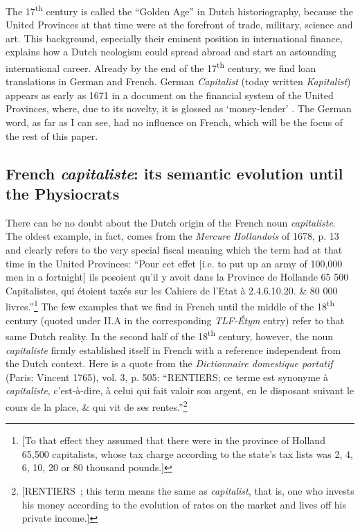 \documentclass[output=paper]{langsci/langscibook}
\begin{document}
\largerpage[-2]
The 17\textsuperscript{th} century is called the ``Golden Age'' in Dutch
historiography, because the United Provinces at that time were at the
forefront of trade, military, science and art. This background,
especially their eminent position in international finance, explains how
a Dutch neologism could spread abroad and start an a\-stounding
international career. Already by the end of the 17\textsuperscript{th}
century, we find loan translations in German and French. German
\emph{Capitalist} (today written \emph{Kapitalist}) appears as early as
1671 in a document on the financial system of the United Provinces,
where, due to its novelty, it is glossed as `money-lender' %
\citep[10]{Rainer98}%
%
. The German word, as far as I can see, had no influence on French,
which will be the focus of the rest of this paper.

\subsection{French \emph{capitaliste}: its semantic evolution until the
Physiocrats}

\largerpage[-2]

There can be no doubt about the Dutch origin of the French noun
\emph{capitaliste}. The oldest example, in fact, comes from the
\emph{Mercure Hollandois} of 1678, p. 13 and clearly refers to the very
special fiscal meaning which the term had at that time in the United
Provinces: ``Pour cet effet {[}i.e. to put up an army of 100,000 men in a
fortnight{]} ils posoient qu'il y avoit dans la Province de Hollande 65
500 Capitalistes, qui étoient taxés sur les Cahiers de l'Etat à
2.4.6.10.20. \& 80 000 livres.''\footnote{{[}To that effect they assumed
  that there were in the province of Holland 65,500 capitalists, whose
  tax charge according to the state's tax lists was 2, 4, 6, 10, 20 or
  80 thousand pounds.{]}} The few examples that we find in French until
the middle of the 18\textsuperscript{th} century (quoted under II.A in
the corresponding \emph{TLF-Étym} entry) refer to that same Dutch
reality. In the second half of the 18\textsuperscript{th} century,
however, the noun \emph{capitaliste} firmly established itself in French
with a reference independent from the Dutch context. Here is a quote
from the \emph{Dictionnaire domestique portatif} (Paris: Vincent 1765),
vol. 3, p. 505: ``RENTIERS; ce terme est synonyme à \emph{capitaliste},
c'est-à-dire, à celui qui fait valoir son argent, en le disposant
suivant le cours de la place, \& qui vit de ses rentes.''\footnote{{[}RENTIERS~;
  this term means the same as \emph{capitalist}, that is, one who
  invests his money according to the evolution of rates on the market
  and lives off his private income.{]}}
\end{document}
